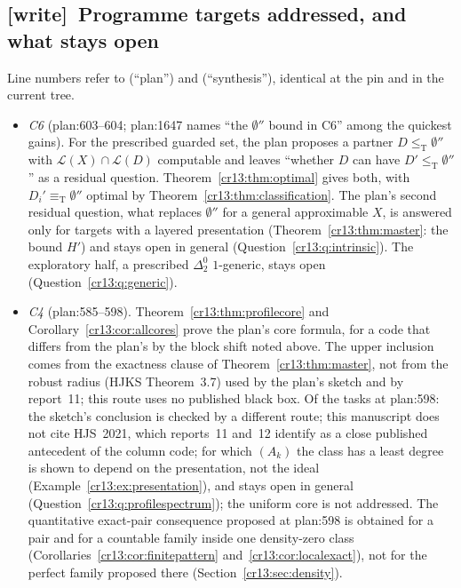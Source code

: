 \documentclass[11pt,letterpaper]{article}
\theoremstyle{definition}
\theoremstyle{remark}\newtheorem{remark}[theorem]{Remark}
\numberwithin{equation}{section}
\newcommand{\leT}{\leq_{\mathrm T}}
\newcommand{\eqT}{\equiv_{\mathrm T}}
\newcommand{\Low}{\mathcal L}
\newcommand{\wtag}{\textup{[write]}}
\begin{document}
\subsection{\wtag\ Programme targets addressed, and what stays open}
\label{cr13:sec:wtargets}
Line numbers refer to  (``plan'') and  (``synthesis''), identical at the pin and in the current tree.
\begin{itemize}
\item \emph{C6} (plan:603--604; plan:1647 names ``the $\emptyset''$ bound in C6'' among the quickest gains). For the prescribed guarded set, the plan proposes a partner $D\leT\emptyset''$ with $\Low(X)\cap\Low(D)$ computable and leaves ``whether $D$ can have $D'\leT\emptyset''$'' as a residual question. Theorem~\ref{cr13:thm:optimal} gives both, with $D_i'\eqT\emptyset''$ optimal by Theorem~\ref{cr13:thm:classification}. The plan's second residual question, what replaces $\emptyset''$ for a general approximable $X$, is answered only for targets with a layered presentation (Theorem~\ref{cr13:thm:master}: the bound $H'$) and stays open in general (Question~\ref{cr13:q:intrinsic}). The exploratory half, a prescribed $\Delta^0_2$ $1$-generic, stays open (Question~\ref{cr13:q:generic}).
\item \emph{C4} (plan:585--598). Theorem~\ref{cr13:thm:profilecore} and Corollary~\ref{cr13:cor:allcores} prove the plan's core formula, for a code that differs from the plan's by the block shift noted above. The upper inclusion comes from the exactness clause of Theorem~\ref{cr13:thm:master}, not from the robust radius (HJKS Theorem~3.7) used by the plan's sketch and by report~11; this route uses no published black box. Of the tasks at plan:598: the sketch's conclusion is checked by a different route; this manuscript does not cite HJS~2021, which reports~11 and~12 identify as a close published antecedent of the column code; for which $(A_k)$ the class has a least degree is shown to depend on the presentation, not the ideal (Example~\ref{cr13:ex:presentation}), and stays open in general (Question~\ref{cr13:q:profilespectrum}); the uniform core is not addressed. The quantitative exact-pair consequence proposed at plan:598 is obtained for a pair and for a countable family inside one density-zero class (Corollaries~\ref{cr13:cor:finitepattern} and~\ref{cr13:cor:localexact}), not for the perfect family proposed there (Section~\ref{cr13:sec:density}).

\end{itemize}
\end{document}
